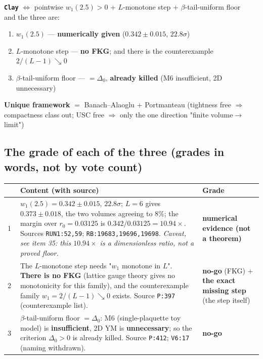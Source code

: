 \documentclass[11pt,a4paper]{article}
\newcommand{\lvNG}{\textcolor{cNG}{\textbf{no-go}}}
\newcommand{\lvM}{\textcolor{cM}{\textbf{the exact missing step}}}
\newcommand{\lvE}{\textcolor{cE}{\textbf{numerical evidence (not a theorem)}}}
\newcommand{\bet}{\beta}
\newcommand{\rO}{r_0}
\newcommand{\Dzero}{\Delta_0}
\begin{document}
\begin{tcolorbox}[colback=white,colframe=black!60,boxrule=0.6pt,arc=2pt,left=8pt,right=8pt,top=6pt,bottom=6pt,breakable]
\textbf{\texttt{Clay}} $\Longleftrightarrow$ pointwise $w_1(2.5)>0$ \;+\; $L$-monotone step \;+\; $\bet$-tail-uniform floor\\
and the three are:
\begin{enumerate}[label=\textcircled{\small\arabic*},leftmargin=2.1em,itemsep=1pt,topsep=3pt]
  \item $w_1(2.5)$ --- \textbf{numerically given} ($0.342\pm0.015$, $22.8\sigma$)
  \item $L$-monotone step --- \textbf{no FKG}; and there is the counterexample $2/(L-1)\searrow 0$
  \item $\bet$-tail-uniform floor --- $=\Dzero$, \textbf{already killed} (M6 insufficient, 2D unnecessary)
\end{enumerate}
\textbf{Unique framework} $=$ Banach--Alaoglu $+$ Portmanteau (tightness free $\Rightarrow$ compactness class out; USC free $\Rightarrow$ only the one direction "finite volume$\to$limit")
\end{tcolorbox}

\subsection{The grade of each of the three (grades in words, not by vote count)}

\begin{center}
\small
\begin{tabularx}{\textwidth}{@{}L{0.9cm}Y L{3.05cm}@{}}
\toprule
 & \textbf{Content (with source)} & \textbf{Grade} \\
\midrule
\textcircled{\small1} & $w_1(2.5)=0.342\pm0.015$, $22.8\sigma$; $L=6$ gives $0.373\pm0.018$, the two volumes agreeing to $8\%$; the margin over $\rO=0.03125$ is $0.342/0.03125=10.94\times$. Sources \texttt{RUN1:52,59}; \texttt{RB:19683,19696,19698}. \emph{Caveat, see item 35: this $10.94\times$ is a dimensionless ratio, not a proved floor.} & \lvE \\
\textcircled{\small2} & The $L$-monotone step needs "$w_1$ monotone in $L$". \textbf{There is no FKG} (lattice gauge theory gives no monotonicity for this family), and the counterexample family $w_1=2/(L-1)\searrow 0$ exists. Source \texttt{P:397} (counterexample list). & \lvNG{} (FKG) $+$ \lvM{} (the step itself)\\
\textcircled{\small3} & $\bet$-tail-uniform floor $=\Dzero$: M6 (single-plaquette toy model) is \textbf{insufficient}, 2D YM is \textbf{unnecessary}; so the criterion $\Dzero>0$ is already killed. Source \texttt{P:412}; \texttt{V6:17} (naming withdrawn). & \lvNG \\
\bottomrule
\end{tabularx}
\end{center}
\end{document}
